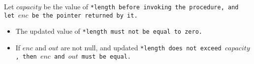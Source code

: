 Let $capacity$ be the value of \tt{*length} before invoking the procedure,
and let  $enc$ be the pointer returned by it.

\begin{itemize}

\item The updated value of \tt{*length} must not be equal to zero.

\item If $enc$ and $out$ are not null, and updated \tt{*length}
does not exceed $capacity$, then $enc$ and $out$ must be equal.

\end{itemize}
